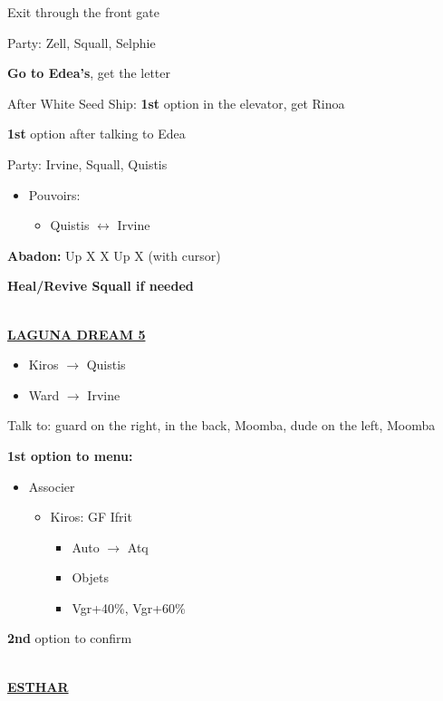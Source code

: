 Exit through the front gate

Party: Zell, Squall, Selphie

\textbf{Go to Edea's}, get the letter

After White Seed Ship: \textbf{1st} option in the elevator, get Rinoa

\textbf{1st} option after talking to Edea

Party: Irvine, Squall, Quistis
\begin{itemize}
	\item Pouvoirs:
		\begin{itemize}
			\item Quistis $\leftrightarrow$ Irvine
		\end{itemize}
\end{itemize}

\textbf{Abadon:} Up X X Up X (with cursor)

\textbf{Heal/Revive Squall if needed}

\leavevmode\\
\underline{\textbf{LAGUNA DREAM 5}}

\begin{itemize}
	\item Kiros $\rightarrow$ Quistis
	\item Ward $\rightarrow$ Irvine
\end{itemize}

Talk to: guard on the right, in the back, Moomba, dude on the left, Moomba

\textbf{1st option to menu:}
\begin{menu}
	\begin{itemize}
		\item Associer
			\begin{itemize}
				\item Kiros: GF Ifrit
					\begin{itemize}
						\item Auto $\rightarrow$ Atq
						\item Objets
						\item Vgr+40\%, Vgr+60\%
					\end{itemize}
			\end{itemize}
	\end{itemize}
\end{menu}

\textbf{2nd} option to confirm

\leavevmode\\
\underline{\textbf{ESTHAR}}

